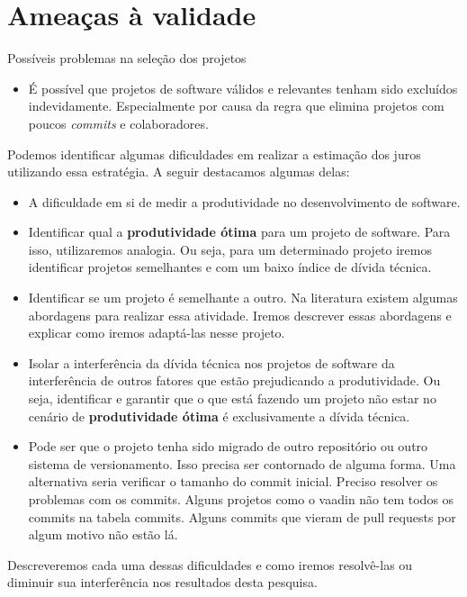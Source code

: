 \chapter{Ameaças à validade}

Possíveis problemas na seleção dos projetos
\begin{itemize}
\item É possível que projetos de software válidos e relevantes tenham sido excluídos indevidamente. Especialmente por causa da regra que elimina projetos com poucos \textit{commits} e colaboradores.
\end{itemize}

Podemos identificar algumas dificuldades em realizar a estimação dos juros utilizando essa estratégia. A seguir destacamos algumas delas:
 
 \begin{itemize}
 \item A dificuldade em si de medir a produtividade no desenvolvimento de software.
 \item Identificar qual a \textbf{produtividade ótima} para um projeto de software. Para isso, utilizaremos analogia. Ou seja, para um determinado projeto iremos identificar projetos semelhantes e com um baixo índice de dívida técnica.
 \item Identificar se um projeto é semelhante a outro. Na literatura existem algumas abordagens para realizar essa atividade. Iremos descrever essas abordagens e explicar como iremos adaptá-las nesse projeto.
 \item Isolar a interferência da dívida técnica nos projetos de software da interferência de outros fatores que estão prejudicando a produtividade. Ou seja, identificar e garantir que o que está fazendo um projeto não estar no cenário de \textbf{produtividade ótima} é exclusivamente a dívida técnica.
 \item Pode ser que o projeto tenha sido migrado de outro repositório ou outro sistema de versionamento. Isso precisa ser contornado de alguma forma. Uma alternativa seria verificar o tamanho do commit inicial. Preciso resolver os problemas com os commits. Alguns projetos como o vaadin não tem todos os commits na tabela commits. Alguns commits que vieram de pull requests por algum motivo não estão lá.
 \end{itemize}
 
 
 
 
 Descreveremos cada uma dessas dificuldades e como iremos resolvê-las ou diminuir sua interferência nos resultados desta pesquisa.
 
